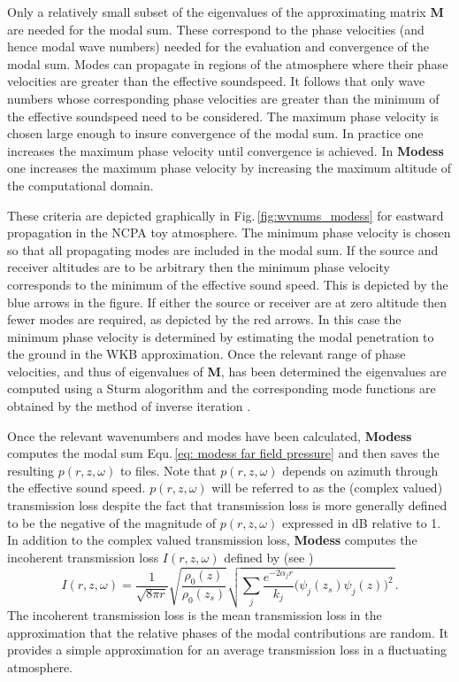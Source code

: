Only a relatively small subset of the eigenvalues of the approximating matrix \textbf{M} are needed for the modal sum. These correspond to the phase velocities (and hence modal wave numbers) needed for the evaluation and convergence of the modal sum. Modes can propagate in regions of the atmosphere where their phase velocities are greater than the effective soundspeed. It follows that only wave numbers whose corresponding phase velocities are greater than the minimum of the effective soundspeed need to be considered. The maximum phase velocity is chosen large enough to insure convergence of the modal sum. In practice one increases the maximum phase velocity until convergence is achieved. In {\bf Modess} one increases the maximum phase velocity by increasing the maximum altitude of the computational domain. 

These criteria are depicted graphically in Fig.\,\ref{fig:wvnums_modess} for eastward propagation in the NCPA toy atmosphere. The minimum phase velocity is chosen so that all propagating modes are included in the modal sum. If the source and receiver altitudes are to be arbitrary then the minimum phase velocity corresponds to the minimum of the effective sound speed. This is depicted by the blue arrows in the figure. If either the source or receiver are at zero altitude then fewer modes are required, as depicted by the red arrows. In this case the minimum phase velocity is determined by estimating the modal penetration to the ground in the WKB approximation. Once the relevant range of phase velocities, and thus of eigenvalues of \textbf{M}, has been determined the eigenvalues are computed using a Sturm alogorithm \cite{Stoer_Bulirsch} and the corresponding mode functions are obtained by the method of inverse iteration \cite{Press:2007:NRE:1403886}. 

Once the relevant wavenumbers and modes have been calculated, {\bf Modess} computes the modal sum Equ.\,\ref{eq: modess far field pressure} and then saves the resulting $p(r,z,\omega)$ to files. Note that $p(r,z,\omega)$ depends on azimuth through the effective sound speed. $p(r,z,\omega)$ will be referred to as the (complex valued) transmission loss despite the fact that transmission loss is more generally defined to be the negative of the magnitude of $p(r,z,\omega)$ expressed in dB relative to 1. In addition to the complex valued transmission loss, {\bf Modess} computes the incoherent transmission loss $I(r,z,\omega)$ defined by (see \cite{comp_oc_ac}) 
\[
I(r,z,\omega)
=
\frac{1}{\sqrt{8 \pi r}} \sqrt{\frac {\rho_0(z)} {\rho_0(z_s)}} \sqrt{\sum_j\frac{e^{-2\alpha_jr}}{k_j}\big(\psi_j(z_s)\psi_j(z)\big)^2\,} .
\]
The incoherent transmission loss is the mean transmission loss in the approximation that the relative phases of the modal contributions are random. It provides a simple approximation for an average transmission loss in a fluctuating atmosphere. 

